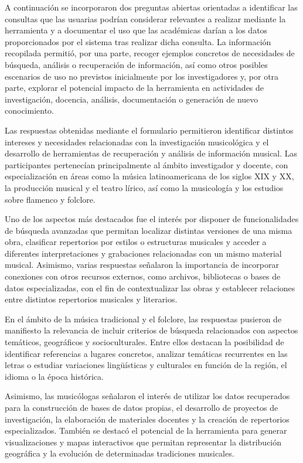 A continuación se incorporaron dos preguntas abiertas orientadas a identificar las consultas que las usuarias podrían considerar relevantes a realizar mediante la herramienta y a documentar el uso que las académicas darían a los datos proporcionados por el sistema tras realizar dicha consulta. 
La información recopilada permitió, por una parte, recoger ejemplos concretos de necesidades de búsqueda, análisis o recuperación de información, así como otros posibles escenarios de uso no previstos inicialmente por los investigadores y, por otra parte, explorar el potencial impacto de la herramienta en actividades de investigación, docencia, análisis, documentación o generación de nuevo conocimiento.

Las respuestas obtenidas mediante el formulario permitieron identificar distintos intereses y necesidades relacionadas con la investigación musicológica y el desarrollo de herramientas de recuperación y análisis de información musical. Las participantes pertenecían principalmente al ámbito investigador y docente, con especialización en áreas como la música latinoamericana de los siglos XIX y XX, la producción musical y el teatro lírico, así como la musicología y los estudios sobre flamenco y folclore.

Uno de los aspectos más destacados fue el interés por disponer de funcionalidades de búsqueda avanzadas que permitan localizar distintas versiones de una misma obra, clasificar repertorios por estilos o estructuras musicales y acceder a diferentes interpretaciones y grabaciones relacionadas con un mismo material musical. Asimismo, varias respuestas señalaron la importancia de incorporar conexiones con otros recursos externos, como archivos, bibliotecas o bases de datos especializadas, con el fin de contextualizar las obras y establecer relaciones entre distintos repertorios musicales y literarios.

En el ámbito de la música tradicional y el folclore, las respuestas pusieron de manifiesto la relevancia de incluir criterios de búsqueda relacionados con aspectos temáticos, geográficos y socioculturales. Entre ellos destacan la posibilidad de identificar referencias a lugares concretos, analizar temáticas recurrentes en las letras o estudiar variaciones lingüísticas y culturales en función de la región, el idioma o la época histórica.

Asimismo, las musicólogas señalaron el interés de utilizar los datos recuperados para la construcción de bases de datos propias, el desarrollo de proyectos de investigación, la elaboración de materiales docentes y la creación de repertorios especializados. También se destacó el potencial de la herramienta para generar visualizaciones y mapas interactivos que permitan representar la distribución geográfica y la evolución de determinadas tradiciones musicales.

